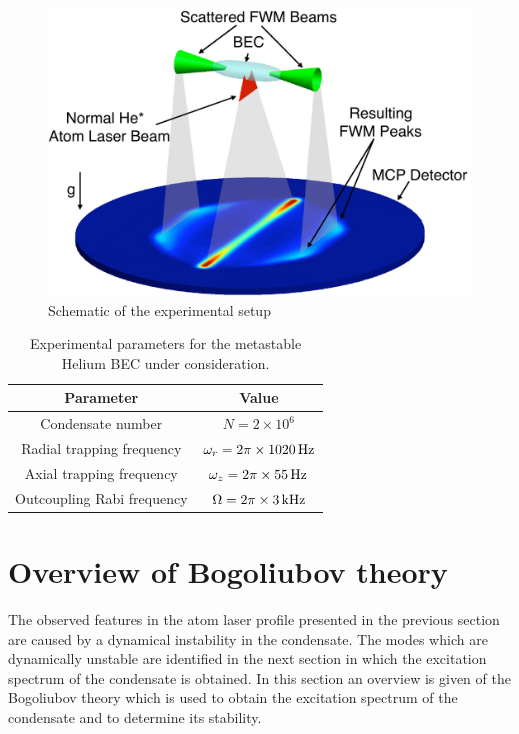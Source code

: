 \begin{figure}
    \centering
        \includegraphics[height=3in]{Schematic}
    \caption{Schematic of the experimental setup}
    \label{Peaks:Schematic}
\end{figure}


\begin{table}
    \centering
    \begin{tabular}{cc}
    \toprule
    Parameter & Value\\
    \midrule
    Condensate number & $N = 2\times 10^6$\\
    Radial trapping frequency & $\omega_r = 2 \pi \times \unit[1020]{Hz}$\\
    Axial trapping frequency & $\omega_z = 2\pi \times \unit[55]{Hz}$\\
    Outcoupling Rabi frequency & $\Omega = 2\pi \times \unit[3]{kHz}$\\
    \bottomrule
    \end{tabular}
    \caption{Experimental parameters for the metastable Helium BEC under consideration.}
    \label{Peaks:ExperimentalParameters}
\end{table}

\section{Overview of Bogoliubov theory}
\label{Peaks:ElementaryExcitations}

The observed features in the atom laser profile presented in the previous section are caused by a dynamical instability in the condensate. The modes which are dynamically unstable are identified in the next section in which the excitation spectrum of the condensate is obtained. In this section an overview is given of the Bogoliubov theory which is used to obtain the excitation spectrum of the condensate and to determine its stability.

